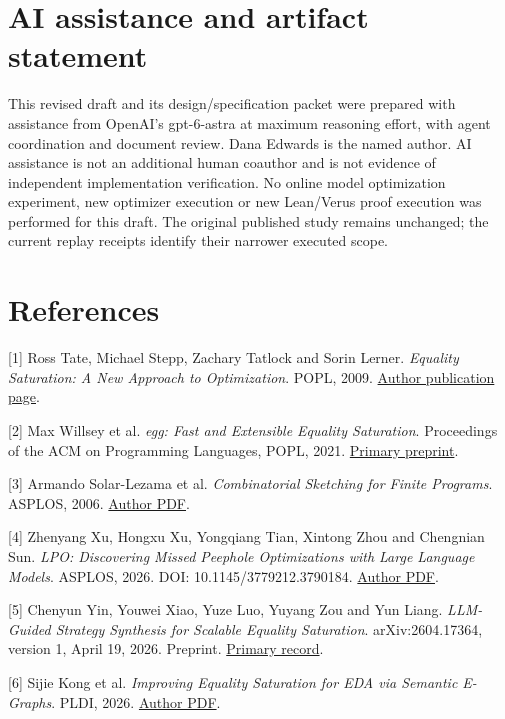 \documentclass[11pt]{article}
\begin{document}
\section{AI assistance and artifact statement}

This revised draft and its design/specification packet were prepared with assistance from OpenAI's gpt-6-astra at maximum reasoning effort, with agent coordination and document review. Dana Edwards is the named author. AI assistance is not an additional human coauthor and is not evidence of independent implementation verification. No online model optimization experiment, new optimizer execution or new Lean/Verus proof execution was performed for this draft. The original published study remains unchanged; the current replay receipts identify their narrower executed scope.

\section{References}

[1] Ross Tate, Michael Stepp, Zachary Tatlock and Sorin Lerner. \emph{Equality Saturation: A New Approach to Optimization}. POPL, 2009. \href{\detokenize{https://rosstate.org/publications/eqsat/}}{Author publication page}.

[2] Max Willsey et al. \emph{egg: Fast and Extensible Equality Saturation}. Proceedings of the ACM on Programming Languages, POPL, 2021. \href{\detokenize{https://arxiv.org/abs/2004.03082}}{Primary preprint}.

[3] Armando Solar-Lezama et al. \emph{Combinatorial Sketching for Finite Programs}. ASPLOS, 2006. \href{\detokenize{https://people.csail.mit.edu/asolar/papers/asplos06-final.pdf}}{Author PDF}.

[4] Zhenyang Xu, Hongxu Xu, Yongqiang Tian, Xintong Zhou and Chengnian Sun. \emph{LPO: Discovering Missed Peephole Optimizations with Large Language Models}. ASPLOS, 2026. DOI: 10.1145/3779212.3790184. \href{\detokenize{https://cs.uwaterloo.ca/~cnsun/public/publication/asplos26/asplos26.pdf}}{Author PDF}.

[5] Chenyun Yin, Youwei Xiao, Yuze Luo, Yuyang Zou and Yun Liang. \emph{LLM-Guided Strategy Synthesis for Scalable Equality Saturation}. arXiv:2604.17364, version 1, April 19, 2026. Preprint. \href{\detokenize{https://arxiv.org/abs/2604.17364v1}}{Primary record}.

[6] Sijie Kong et al. \emph{Improving Equality Saturation for EDA via Semantic E-Graphs}. PLDI, 2026. \href{\detokenize{https://zsisco.net/papers/nextmap-pldi26.pdf}}{Author PDF}.
\end{document}
